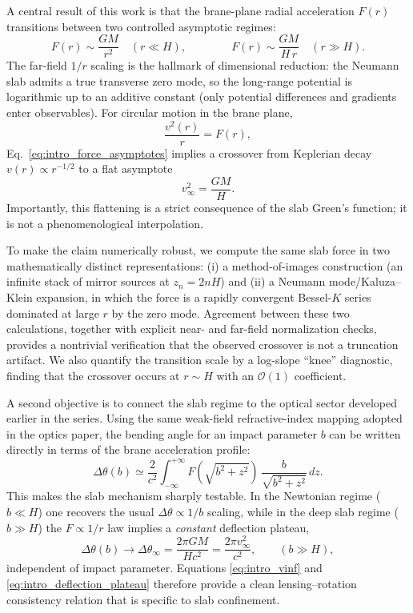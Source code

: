 \documentclass[11pt]{article}
\begin{document}
A central result of this work is that the brane-plane radial acceleration $F(r)$ transitions between
two controlled asymptotic regimes:
\begin{equation}
  F(r)\sim \frac{GM}{r^2}\quad (r\ll H),
  \qquad\qquad
  F(r)\sim \frac{GM}{H\,r}\quad (r\gg H).
  \label{eq:intro_force_asymptotes}
\end{equation}
The far-field $1/r$ scaling is the hallmark of dimensional reduction: the Neumann slab admits a true
transverse zero mode, so the long-range potential is logarithmic up to an additive constant (only
potential differences and gradients enter observables).
For circular motion in the brane plane,
\begin{equation}
  \frac{v^2(r)}{r}=F(r),
\end{equation}
Eq.~\eqref{eq:intro_force_asymptotes} implies a crossover from Keplerian decay $v(r)\propto r^{-1/2}$
to a flat asymptote
\begin{equation}
  v_\infty^2=\frac{GM}{H}.
  \label{eq:intro_vinf}
\end{equation}
Importantly, this flattening is a strict consequence of the slab Green's function; it is not a
phenomenological interpolation.

To make the claim numerically robust, we compute the same slab force in two mathematically distinct
representations: (i) a method-of-images construction (an infinite stack of mirror sources at
$z_n=2nH$) and (ii) a Neumann mode/Kaluza--Klein expansion, in which the force is a rapidly convergent
Bessel-$K$ series dominated at large $r$ by the zero mode.
Agreement between these two calculations, together with explicit near- and far-field normalization
checks, provides a nontrivial verification that the observed crossover is not a truncation artifact.
We also quantify the transition scale by a log-slope ``knee'' diagnostic, finding that the crossover
occurs at $r\sim H$ with an $\mathcal{O}(1)$ coefficient.

A second objective is to connect the slab regime to the optical sector developed earlier in the
series.  Using the same weak-field refractive-index mapping adopted in the optics paper, the bending
angle for an impact parameter $b$ can be written directly in terms of the brane acceleration profile:
\begin{equation}
  \Delta\theta(b)\simeq \frac{2}{c^2}\int_{-\infty}^{+\infty}
  F\!\left(\sqrt{b^2+z^2}\right)\,\frac{b}{\sqrt{b^2+z^2}}\,dz.
  \label{eq:intro_deflection_general}
\end{equation}
This makes the slab mechanism sharply testable.
In the Newtonian regime ($b\ll H$) one recovers the usual $\Delta\theta\propto 1/b$ scaling, while in
the deep slab regime ($b\gg H$) the $F\propto 1/r$ law implies a \emph{constant} deflection plateau,
\begin{equation}
  \Delta\theta(b)\to \Delta\theta_\infty=\frac{2\pi GM}{Hc^2}
  =\frac{2\pi v_\infty^2}{c^2},
  \qquad (b\gg H),
  \label{eq:intro_deflection_plateau}
\end{equation}
independent of impact parameter.
Equations \eqref{eq:intro_vinf} and \eqref{eq:intro_deflection_plateau} therefore provide a clean
lensing--rotation consistency relation that is specific to slab confinement.
\end{document}
